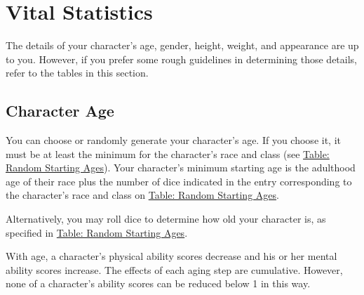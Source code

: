 \section{Vital Statistics}
The details of your character's age, gender, height, weight, and appearance are up to you. However, if you prefer some rough guidelines in determining those details, refer to the tables in this section.

\subsection{Character Age}
You can choose or randomly generate your character's age. If you choose it, it must be at least the minimum for the character's race and class (see \hyperref[tab:Random Starting Ages]{Table: Random Starting Ages}). Your character's minimum starting age is the adulthood age of their race plus the number of dice indicated in the entry corresponding to the character's race and class on \hyperref[tab:Random Starting Ages]{Table: Random Starting Ages}.

Alternatively, you may roll dice to determine how old your character is, as specified in \hyperref[tab:Random Starting Ages]{Table: Random Starting Ages}.


With age, a character's physical ability scores decrease and his or her mental ability scores increase. The effects of each aging step are cumulative. However, none of a character's ability scores can be reduced below 1 in this way.

